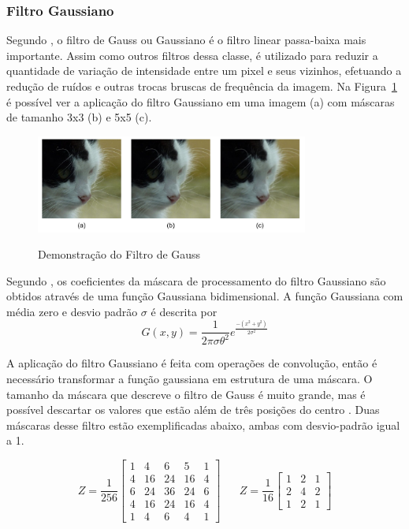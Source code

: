 \documentclass[12pt,oneside,a4paper,english,french,spanish,brazil,]{abntex2}
\begin{document}
\subsubsection{Filtro Gaussiano}

Segundo \citet{conci:2003}, o filtro de Gauss ou Gaussiano é o filtro linear passa-baixa mais importante. Assim como outros filtros dessa classe, é utilizado para reduzir a quantidade de variação de intensidade entre um pixel e seus vizinhos, efetuando a redução de ruídos e outras trocas bruscas de frequência da imagem. Na Figura~\ref{fig:PDI_Gauss} é possível ver a aplicação do filtro Gaussiano em uma imagem (a) com máscaras de tamanho 3x3 (b) e 5x5 (c).

\begin{figure}[ht]
\centering
\caption{Demonstração do Filtro de Gauss}
\includegraphics[width=0.8\textwidth]{imagens/PDI_Gauss.pdf}
\sourceAuthor
\label{fig:PDI_Gauss}
\end{figure}

Segundo \citet{pedrini:2008}, os coeficientes da máscara de processamento do filtro Gaussiano são obtidos através de uma função Gaussiana bidimensional. A função Gaussiana com média zero e desvio padrão \(\sigma\) é descrita por \[G(x,y)=\frac{1}{2\pi\sigma\theta^2} e^{\frac{-(x^2+y^2)}{2\sigma^2}  }\]

A aplicação do filtro Gaussiano é feita com operações de convolução, então é necessário transformar a função gaussiana em estrutura de uma máscara. O tamanho da máscara que descreve o filtro de Gauss é muito grande, mas é possível descartar os valores que estão além de três posições do centro \cite{conci:2003}. Duas máscaras desse filtro estão exemplificadas abaixo, ambas com desvio-padrão igual a 1.

\[Z=\frac{1}{256}\begin{bmatrix}
1 & 4 & 6 & 5 & 1\\ 
4 & 16 & 24 & 16 & 4\\ 
6 & 24 & 36 & 24 & 6\\ 
4 & 16 & 24 & 16 & 4\\ 
1 & 4 & 6 & 4 & 1
\end{bmatrix}
\; \; \; \; \; \; 
Z=\frac{1}{16}\begin{bmatrix}
1 & 2 & 1\\ 
2 & 4 & 2\\ 
1 & 2 & 1
\end{bmatrix}
\]
\end{document}
